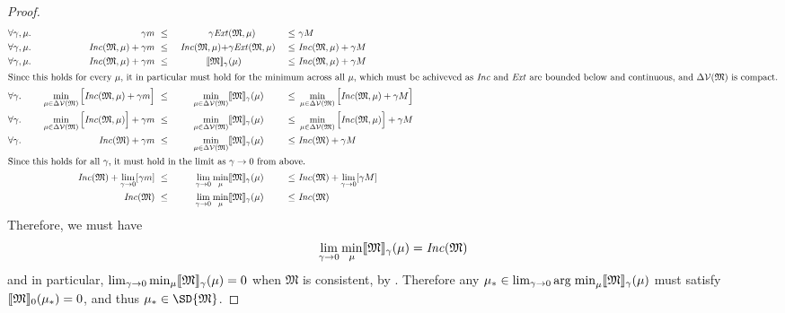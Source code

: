 \documentclass{article}
\DeclareMathOperator*{\argmin}{arg\;min}
\newcommand{\dg}[1]{\mathfrak{#1}}
\def\extrsymb{\mathit{Ext}}
\def\inco{\mathit{Inc}}
\newcommand{\V}{\mathcal V}
\begin{document}
\begin{proof}
        \begin{alignat*}{4}\relax
            &\forall\gamma,\mu.~&\gamma\lb &~\leq~& \gamma\extrsymb&(\dg M, \mu)  &~\leq~&  \gamma\ub \\
            &\forall\gamma,\mu.~&
            \inco(\dg M, \mu) + \gamma\lb &~\leq~& \inco(\dg M, \mu) +& \gamma\extrsymb(\dg M, \mu)  &~\leq~&  \inco(\dg M, \mu) + \gamma\ub \\
            &\forall\gamma,\mu.~&
            \inco(\dg M, \mu) + \gamma\lb &~\leq~& \bbr{\dg M }_\gamma&(\mu)  &~\leq~&  \inco(\dg M, \mu) + \gamma\ub \\
        \intertext{Since this holds for every $\mu$, it in particular must hold for the minimum across all $\mu$, which must be achiveved as $\inco$ and $\extrsymb$ are bounded below and continuous, and $\Delta\V(\dg M)$ is compact.}
        &\forall\gamma.~&
            \min_{\mu \in \Delta\V(\dg M)} \Big[ \inco(\dg M, \mu) + \gamma\lb \Big]&~\leq~& 
                \min_{\mu \in \Delta\V(\dg M)}& \bbr{\dg M }_\gamma(\mu)  &~\leq~&  
                \min_{\mu \in \Delta\V(\dg M)} \Big[ \inco(\dg M, \mu) + \gamma\ub \Big]\\
        &\forall\gamma.~&
            \min_{\mu \in \Delta\V(\dg M)} \Big[ \inco(\dg M, \mu)\Big] + \gamma\lb &~\leq~& 
                \min_{\mu \in \Delta\V(\dg M)}& \bbr{\dg M }_\gamma(\mu)  &~\leq~&  
                \min_{\mu \in \Delta\V(\dg M)} \Big[ \inco(\dg M, \mu) \Big] + \gamma\ub\\
        &\forall\gamma.~&
            \inco(\dg M) + \gamma\lb &~\leq~& 
                \min_{\mu \in \Delta\V(\dg M)}& \bbr{\dg M }_\gamma(\mu)  &~\leq~&  
                \inco(\dg M) + \gamma\ub\\
        \intertext{Since this holds for all $\gamma$, it must hold in the limit as $\gamma \to 0$ from above.}
        &&
            \inco(\dg M) + \lim_{\gamma\to 0} [\gamma\lb ]&~\leq~& 
                \lim_{\gamma\to 0}\min_{\mu } &\bbr{\dg M }_\gamma(\mu)  &~\leq~&  
                \inco(\dg M) + \lim_{\gamma\to 0} [\gamma\ub] \\
        &&
            \inco(\dg M) &~\leq~& 
                \lim_{\gamma\to 0}\min_\mu & \bbr{\dg M }_\gamma(\mu)  &~\leq~&  
                 \inco(\dg M)\\
        \end{alignat*}
        Therefore, we must have
        \[\lim_{\gamma\to 0}\min_\mu \bbr{\dg M }_\gamma(\mu) = \inco(\dg M) \]
        and in particular, $\lim_{\gamma\to 0}\min_\mu \bbr{\dg M }_\gamma(\mu) = 0$ when $\dg M$ is consistent, by . Therefore any $\mu_* \in \lim_{\gamma \to 0}\argmin_\mu \bbr{\dg M}_\gamma(\mu)$ must satisfy $\bbr{\dg M}_0(\mu_*) = 0$, and thus $\mu_* \in \SD{\dg M}$.
    \end{proof}
\end{document}
